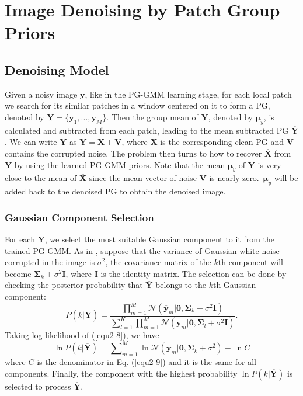 \section{Image Denoising by Patch Group Priors}
\subsection{Denoising Model}
Given a noisy image $\bm{y}$, like in the PG-GMM learning stage, for each local patch we search for its similar patches in a window centered on it to form a PG, denoted by $\bm{Y} = \{\bm{y}_{1},...,\bm{y}_{M}\}$. Then the group mean of $\bm{Y}$, denoted by $\bm{\mu}_{y}$, is calculated and subtracted from each patch, leading to the mean subtracted PG $\bm{\overline{Y}}$. We can write $\bm{\overline{Y}}$ as $\bm{\overline{Y}}=\bm{\overline{X}}+\bm{V}$, where $\bm{\overline{X}}$ is the corresponding clean PG and $\bm{V}$ contains the corrupted noise. The problem then turns to how to recover $\bm{\overline{X}}$ from $\bm{\overline{Y}}$ by using the learned PG-GMM priors. Note that the mean $\bm{\mu}_{y}$ of $\bm{\overline{Y}}$  is very close to the mean of $\bm{\overline{X}}$ since the mean vector of noise $\bm{V}$ is nearly zero.\ $\bm{\mu}_{y}$ will be added back to the denoised PG to obtain the denoised image. 

\subsubsection{Gaussian Component Selection}
For each $\bm{\overline{Y}}$, we select the most suitable Gaussian component to it from the trained PG-GMM. As in \cite{epll}, suppose that the variance of Gaussian white noise corrupted in the image is $\sigma^{2}$, the covariance matrix of the $k$th component will become $\bm{\Sigma}_{k}+\sigma^{2}\bm{I}$, where $\bm{I}$ is the identity matrix. The selection can be done by checking the posterior probability that $\bm{\overline{Y}}$ belongs to the $k$th Gaussian component:
\begin{equation}
\label{equ2-8}
P(k|\bm{\overline{Y}})=\frac{\prod_{m=1}^{M}\mathcal{N}(\bm{\overline{y}}_{m}|\bm{0},\bm{\Sigma}_{k}+\sigma^{2}\bm{I})}{\sum_{l=1}^{K}\prod_{m=1}^{M}\mathcal{N}(\bm{\overline{y}}_{m}|\bm{0},\bm{\Sigma}_{l}+\sigma^{2}\bm{I})}.
\end{equation}
Taking log-likelihood of (\ref{equ2-8}), we have
\begin{equation}
\label{equ2-9}
\ln P(k|\bm{\overline{Y}}) = \sum\nolimits_{m=1}^{M}\ln\mathcal{N}(\bm{\overline{y}}_{m}|\bm{0},\bm{\Sigma}_{k}+\sigma^{2})-\ln{C}
\end{equation}
where $C$ is the denominator in Eq. (\ref{equ2-9}) and it is the same for all components. Finally, the component with the highest probability $\ln P(k|\bm{\overline{Y}})$ is selected to process $\bm{\overline{Y}}$.



